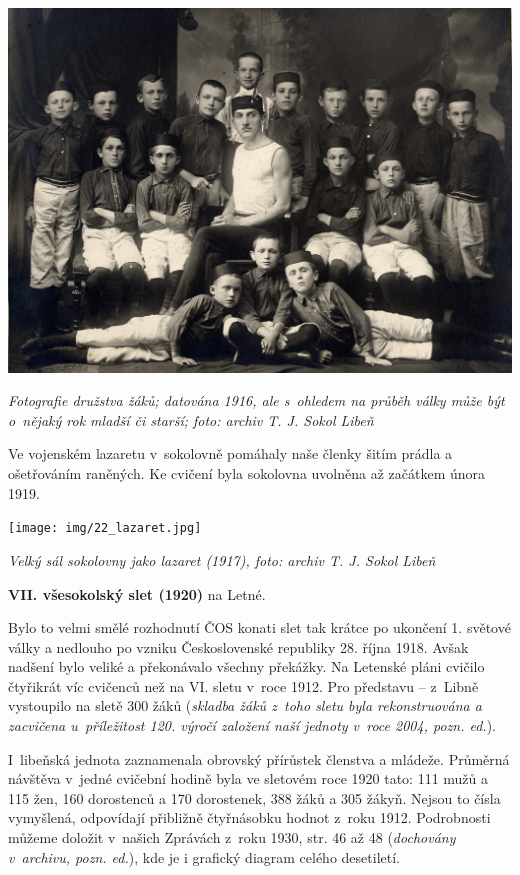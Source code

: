 \documentclass[a5paper, 11pt, twoside]{article}
\begin{document}
 \includegraphics[width=\textwidth]{img/21_zaci_1916.jpg}

\textit{Fotografie družstva žáků; datována 1916, ale s~ohledem na průběh
války může být o~nějaký rok mladší či starší; foto: archiv T. J.
Sokol Libeň}

Ve vojenském lazaretu v~sokolovně pomáhaly naše členky šitím prádla a
ošetřováním raněných. Ke cvičení byla sokolovna uvolněna až začátkem
února 1919.

 \texttt{[image: img/22\_lazaret.jpg]}

\textit{Velký sál sokolovny jako lazaret (1917), foto: archiv T. J. Sokol
Libeň}

\textbf{VII. všesokolský slet (1920)} na Letné.

Bylo to velmi smělé rozhodnutí ČOS konati slet tak krátce po ukončení 1.
světové války a nedlouho po vzniku Československé republiky 28. října
1918. Avšak nadšení bylo veliké a překonávalo všechny překážky. Na
Letenské pláni cvičilo čtyřikrát víc cvičenců než na VI. sletu v~roce
1912. Pro představu -- z~Libně vystoupilo na sletě 300 žáků
(\textit{skladba žáků z~toho sletu byla rekonstruována a zacvičena
u~příležitost 120. výročí založení naší jednoty v~roce 2004, pozn. ed.}).

I~libeňská jednota zaznamenala obrovský přírůstek členstva a mládeže.
Průměrná návštěva v~jedné cvičební hodině byla ve sletovém roce 1920
tato: 111 mužů a 115 žen, 160 dorostenců a 170 dorostenek, 388 žáků a
305 žákyň. Nejsou to čísla vymyšlená, odpovídají přibližně čtyřnásobku
hodnot z~roku 1912. Podrobnosti můžeme doložit v~našich Zprávách z~roku
1930, str. 46 až 48 (\textit{dochovány v~archivu, pozn. ed.}), kde je i
grafický diagram celého desetiletí.
\end{document}
